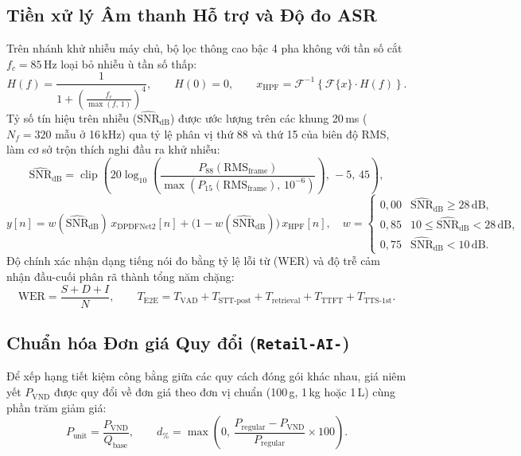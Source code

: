 \subsection*{Tiền xử lý Âm thanh Hỗ trợ và Độ đo ASR}
Trên nhánh khử nhiễu máy chủ, bộ lọc thông cao bậc 4 pha không với tần số cắt $f_c = 85\,\text{Hz}$ loại bỏ nhiễu ù tần số thấp:
\begin{equation}
    H(f) = \frac{1}{1 + \left(\frac{f_c}{\max(f,\,1)}\right)^4}, \qquad H(0) = 0, \qquad x_{\text{HPF}} = \mathcal{F}^{-1}\!\left\{\mathcal{F}\{x\} \cdot H(f)\right\}.
    \label{eq:hpf85}
\end{equation}
Tỷ số tín hiệu trên nhiễu ($\widehat{\text{SNR}}_{\text{dB}}$) được ước lượng trên các khung 20\,ms ($N_f = 320$ mẫu ở 16\,kHz) qua tỷ lệ phân vị thứ 88 và thứ 15 của biên độ RMS, làm cơ sở trộn thích nghi đầu ra khử nhiễu:
\begin{equation}
    \widehat{\text{SNR}}_{\text{dB}} = \operatorname{clip}\!\left(20 \log_{10}\!\left(\frac{P_{88}(\text{RMS}_{\text{frame}})}{\max(P_{15}(\text{RMS}_{\text{frame}}),\,10^{-6})}\right),\,-5,\,45\right),
    \label{eq:snr_est}
\end{equation}
\begin{equation}
    y[n] = w(\widehat{\text{SNR}}_{\text{dB}})\, x_{\text{DPDFNet2}}[n] + \bigl(1 - w(\widehat{\text{SNR}}_{\text{dB}})\bigr)\, x_{\text{HPF}}[n], \quad
    w = \begin{cases}
        0{,}00 & \widehat{\text{SNR}}_{\text{dB}} \ge 28\,\text{dB}, \\
        0{,}85 & 10 \le \widehat{\text{SNR}}_{\text{dB}} < 28\,\text{dB}, \\
        0{,}75 & \widehat{\text{SNR}}_{\text{dB}} < 10\,\text{dB}.
    \end{cases}
    \label{eq:snr_blend}
\end{equation}
Độ chính xác nhận dạng tiếng nói đo bằng tỷ lệ lỗi từ (WER) và độ trễ cảm nhận đầu-cuối phân rã thành tổng năm chặng:
\begin{equation}
    \text{WER} = \frac{S + D + I}{N}, \qquad T_{\text{E2E}} = T_{\text{VAD}} + T_{\text{STT-post}} + T_{\text{retrieval}} + T_{\text{TTFT}} + T_{\text{TTS-1st}}.
    \label{eq:wer_latency}
\end{equation}

\subsection*{Chuẩn hóa Đơn giá Quy đổi (\texttt{Retail-AI-})}
Để xếp hạng tiết kiệm công bằng giữa các quy cách đóng gói khác nhau, giá niêm yết $P_{\text{VND}}$ được quy đổi về đơn giá theo đơn vị chuẩn (100\,g, 1\,kg hoặc 1\,L) cùng phần trăm giảm giá:
\begin{equation}
    P_{\text{unit}} = \frac{P_{\text{VND}}}{Q_{\text{base}}}, \qquad d_{\%} = \max\!\left(0,\, \frac{P_{\text{regular}} - P_{\text{VND}}}{P_{\text{regular}}} \times 100\right).
    \label{eq:unit_price}
\end{equation}

